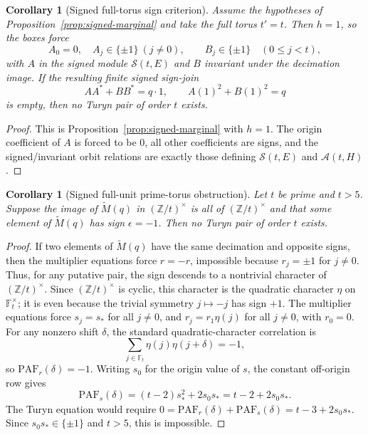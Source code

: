 \documentclass[11pt]{article}
\theoremstyle{plain}
\newtheorem{corollary}[theorem]{Corollary}
\theoremstyle{definition}
\theoremstyle{remark}
\newcommand{\Z}{\mathbb Z}
\newcommand{\F}{\mathbb F}
\newcommand{\paf}{\mathrm{PAF}}
\begin{document}
\begin{corollary}[Signed full-torus sign criterion]
\label{cor:signed-full-torus-sign}
Assume the hypotheses of Proposition~\ref{prop:signed-marginal} and take the
full torus $t'=t$.  Then $h=1$, so the boxes force
\[
  A_0=0,\quad A_j\in\{\pm1\}\ (j\ne0),\qquad
  B_j\in\{\pm1\}\quad(0\le j<t),
\]
with $A$ in the signed module $\mathcal S(t,E)$ and $B$ invariant under the
decimation image.  If the resulting finite signed sign-join
\[
  AA^*+BB^*=q\cdot1,\qquad A(1)^2+B(1)^2=q
\]
is empty, then no Turyn pair of order $t$ exists.
\end{corollary}

\begin{proof}
This is Proposition~\ref{prop:signed-marginal} with $h=1$.  The origin
coefficient of $A$ is forced to be $0$, all other coefficients are signs, and
the signed/invariant orbit relations are exactly those defining
$\mathcal S(t,E)$ and $\mathcal A(t,H)$.
\end{proof}

\begin{corollary}[Signed full-unit prime-torus obstruction]
\label{cor:signed-full-unit-prime}
Let $t$ be prime and $t>5$.  Suppose the image of $\widetilde M(q)$ in
$(\Z/t)^\times$ is all of $(\Z/t)^\times$ and that some element of
$\widetilde M(q)$ has sign $\epsilon=-1$.  Then no Turyn pair of order $t$
exists.
\end{corollary}

\begin{proof}
If two elements of $\widetilde M(q)$ have the same decimation and opposite
signs, then the multiplier equations force $r=-r$, impossible because
$r_j=\pm1$ for $j\ne0$.  Thus, for any putative pair, the sign descends to a
nontrivial character of $(\Z/t)^\times$.  Since $(\Z/t)^\times$ is cyclic, this
character is the quadratic character $\eta$ on $\F_t^\times$; it is even
because the trivial symmetry $j\mapsto-j$ has sign $+1$.  The multiplier
equations force $s_j=s_*$ for all $j\ne0$, and $r_j=r_1\eta(j)$ for all
$j\ne0$, with $r_0=0$.
For any nonzero shift $\delta$, the standard quadratic-character correlation is
\[
  \sum_{j\in\F_t}\eta(j)\eta(j+\delta)=-1,
\]
so $\paf_r(\delta)=-1$.  Writing $s_0$ for the origin value of $s$, the
constant off-origin row gives
\[
  \paf_s(\delta)=(t-2)s_*^2+2s_0s_*=t-2+2s_0s_* .
\]
The Turyn equation would require
$0=\paf_r(\delta)+\paf_s(\delta)=t-3+2s_0s_*$.  Since
$s_0s_*\in\{\pm1\}$ and $t>5$, this is impossible.
\end{proof}
\end{document}
